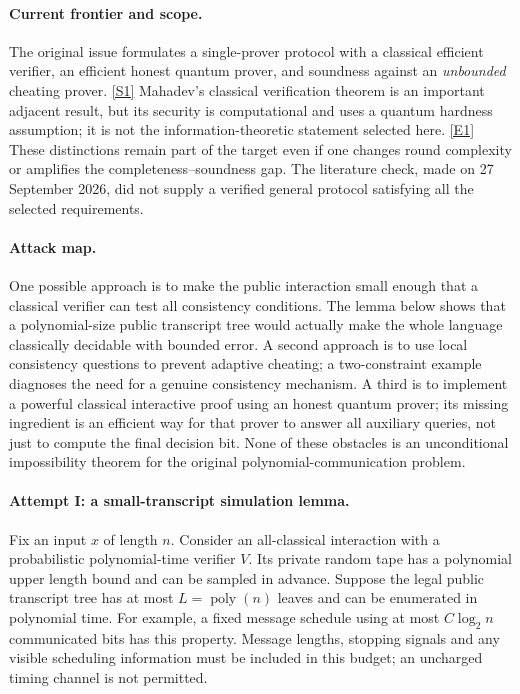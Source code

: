\documentclass[11pt,a4paper]{article}
\newcommand{\sref}[2]{\hyperlink{source:#1:#2}{[S#2]}}
\newcommand{\eref}[2]{\hyperlink{extra:#1:#2}{[E#2]}}
\numberwithin{equation}{section}
\begin{document}
\paragraph{Current frontier and scope.}
The original issue formulates a single-prover protocol with a classical
efficient verifier, an efficient honest quantum prover, and soundness
against an \emph{unbounded} cheating prover. \sref{statement}{1}
Mahadev's classical verification theorem is an important adjacent result,
but its security is computational and uses a quantum hardness assumption;
it is not the information-theoretic statement selected here.
\eref{statement}{1}  These distinctions remain part of the target even if
one changes round complexity or amplifies the completeness--soundness
gap.  The literature check, made on 27 September 2026, did not supply
a verified general protocol satisfying all the selected requirements.

\paragraph{Attack map.}
One possible approach is to make the public interaction small enough
that a classical verifier can test all consistency conditions.  The
lemma below shows that a polynomial-size public transcript tree would
actually make the whole language classically decidable with bounded
error.  A second approach is to use local consistency questions to
prevent adaptive cheating; a two-constraint example diagnoses the
need for a genuine consistency mechanism.  A third is to implement a
powerful classical interactive proof using an honest quantum prover;
its missing ingredient is an efficient way for that prover to answer
all auxiliary queries, not just to compute the final decision bit.
None of these obstacles is an unconditional impossibility theorem for
the original polynomial-communication problem.

\paragraph{Attempt I: a small-transcript simulation lemma.}
Fix an input $x$ of length $n$.  Consider an all-classical interaction
with a probabilistic polynomial-time verifier $V$.  Its private random
tape has a polynomial upper length bound and can be sampled in advance.
Suppose the legal public transcript tree has at most $L=\operatorname{poly}(n)$
leaves and can be enumerated in polynomial time.  For example, a fixed
message schedule using at most $C\log_2 n$ communicated bits has this
property.  Message lengths, stopping signals and any visible scheduling
information must be included in this budget; an uncharged timing
channel is not permitted.
\end{document}
